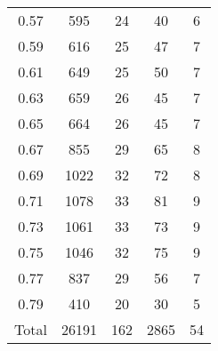 \begin{table}[h!]
\begin{minipage}{\textwidth}
\begin{center}
\begin{tabular}{c|c|c|c|c}
0.57  & 595  & 24  & 40  & 6\\
0.59  & 616  & 25  & 47  & 7\\
0.61  & 649  & 25  & 50  & 7\\
0.63  & 659  & 26  & 45  & 7\\
0.65  & 664  & 26  & 45  & 7\\
0.67  & 855  & 29  & 65  & 8\\
0.69  & 1022  & 32  & 72  & 8\\
0.71  & 1078  & 33  & 81  & 9\\
0.73  & 1061  & 33  & 73  & 9\\
0.75  & 1046  & 32  & 75  & 9\\
0.77  & 837  & 29  & 56  & 7\\
0.79  & 410  & 20  & 30  & 5\\
\hline
Total  & 26191  & 162 & 2865 & 54 \\
\hline \hline
\end{tabular}


\end{center}
\end{minipage}
\end{table}